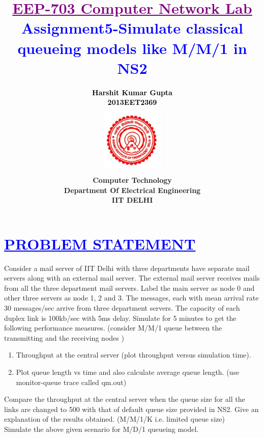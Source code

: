 \documentclass[a4paper,12pt]{report}
\title{\bfseries\huge \textcolor{purple}{\underline {EEP-703 Computer Network Lab}} \\{\textcolor{blue}{Assignment5-Simulate classical queueing models like M/M/1 in NS2}}}
\author{\bfseries\large\textcolor{black}  {Harshit Kumar Gupta}\\ {\textcolor{black} {2013EET2369 }}\\
\includegraphics[width=3cm,height=3.4cm]{./iit.png}\\\noindent Computer Technology\\
\noindent Department Of Electrical Engineering\\IIT DELHI}
\begin{document}
\maketitle
\tableofcontents


\chapter{\textcolor{blue}{\underline {PROBLEM STATEMENT}}}
\noindent 

         Consider a mail server of IIT Delhi with three departments have separate mail servers along
with an external mail server. The external mail server receives mails from all the three
department mail servers. Label the main server as node 0 and other three servers as node 1, 2
and 3. The messages, each with mean arrival rate 30 messages/sec arrive from three
department servers. The capacity of each duplex link is 100kb/sec with 5ms delay. Simulate
for 5 minutes to get the following performance measures. (consider M/M/1 queue between
the transmitting and the receiving nodes )

	
	\begin{enumerate}
	  \item Throughput at the central server (plot throughput versus simulation time).
	  \item  Plot queue length vs time and also calculate average queue length. (use monitor-queue
                 trace called qm.out)
	\end{enumerate}
	\noindent Compare the throughput at the central server when the queue size for all the links are changed
to 500 with that of default queue size provided in NS2. Give an explanation of the results
obtained. (M/M/1/K i.e. limited queue size)\\
	\noindent Simulate the above given scenario for M/D/1 queueing model.
\end{document}
